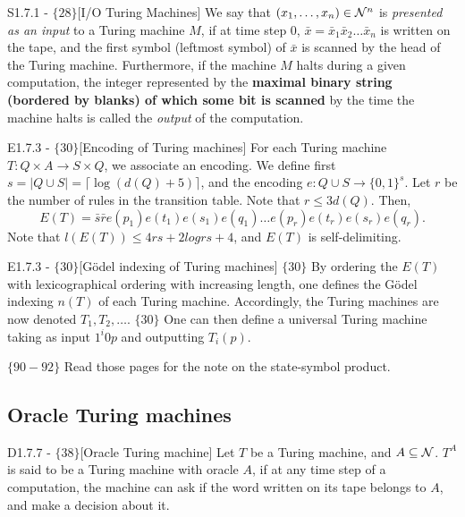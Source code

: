 \documentclass{article}
\begin{document}
\begin{flexidefinition}{S1.7.1 - $\{28\}$}[I/O Turing Machines]
{\label{def:computable function}  We say that $(x_1, \ldots, x_n) \in 
\mathcal{N}^n$ is \textit{presented as an input} to a Turing machine $M$, if at time step $0$, $\bar x = \bar x_1 \bar x_2 \ldots \bar x_n$ is written on the tape, and the first symbol (leftmost symbol) of $\bar x$ is scanned by the head of the Turing machine. Furthermore, if the machine $M$ halts during a given computation, the integer represented by the \textbf{maximal binary string (bordered by blanks) of which some bit is scanned} by the time the machine halts is called the \textit{output} of the computation.}
\end{flexidefinition}

\begin{flexidefinition}{E1.7.3 - $\{30\}$}[Encoding of Turing machines]
    For each Turing machine $T: Q \times A \to S \times Q$, we associate an encoding. We define first $s = |Q \cup S| = \lceil \log(d(Q) + 5) \rceil$, and the encoding $e : Q \cup S \to \{0,1\}^s$. Let $r$ be the number of rules in the transition table. Note that $r \leq 3d(Q)$. Then,
    \begin{equation}
        E(T) = \bar s \bar r e(p_1)e(t_1)e(s_1)e(q_1) \ldots e(p_r)e(t_r)e(s_r)e(q_r).
    \end{equation}
    Note that $l(E(T)) \leq 4rs + 2 logrs + 4$, and $E(T)$ is self-delimiting.
\end{flexidefinition}

\begin{flexidefinition}{E1.7.3 - $\{30\}$}[Gödel indexing of Turing machines]
$\{30\}$ By ordering the $E(T)$ with lexicographical ordering with increasing length, one defines the Gödel indexing $n(T)$ of each Turing machine. Accordingly, the Turing machines are now denoted $T_1, T_2, \ldots$. $\{30\}$ One can then define a universal Turing machine taking as input $1^i0p$ and outputting $T_i(p)$. 
\end{flexidefinition}

$\{90-92\}$ Read those pages for the note on the state-symbol product.

\subsection{Oracle Turing machines}

\begin{flexidefinition}{D1.7.7 - $\{ 38 \}$}[Oracle Turing machine]
     Let $T$ be a Turing machine, and $A \subseteq \mathcal{N}$. $T^A$ is said to be a Turing machine with oracle $A$, if at any time step of a computation, the machine can ask if the word written on its tape belongs to $A$, and make a decision about it.
\end{flexidefinition}
\end{document}
